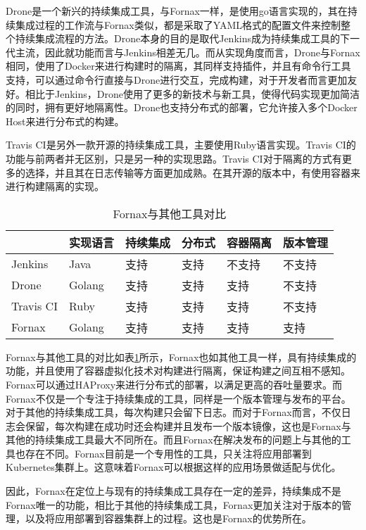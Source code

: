 Drone是一个新兴的持续集成工具，与Fornax一样，是使用go语言实现的，其在持续集成过程的工作流与Fornax类似，都是采取了YAML格式的配置文件来控制整个持续集成流程的方法。Drone本身的目的是取代Jenkins成为持续集成工具的下一代主流，因此就功能而言与Jenkins相差无几。而从实现角度而言，Drone与Fornax相同，使用了Docker来进行构建时的隔离，其同样支持插件，并且有命令行工具支持，可以通过命令行直接与Drone进行交互，完成构建，对于开发者而言更加友好。相比于Jenkins，Drone使用了更多的新技术与新工具，使得代码实现更加简洁的同时，拥有更好地隔离性。Drone也支持分布式的部署，它允许接入多个Docker Host来进行分布式的构建。

Travis CI是另外一款开源的持续集成工具，主要使用Ruby语言实现。Travis CI的功能与前两者并无区别，只是另一种的实现思路。Travis CI对于隔离的方式有更多的选择，并且其在日志传输等方面更加成熟。在其开源的版本中，有使用容器来进行构建隔离的实现。

\begin{table}[!hpb]
  \centering
  \caption{Fornax与其他工具对比}
  \label{tab:advantage}
  \begin{tabular}{llllll} \toprule
     & 实现语言 & 持续集成 & 分布式 & 容器隔离 & 版本管理 \\ \midrule
    Jenkins & Java & 支持 & 支持 & 不支持 & 不支持 \\
    Drone & Golang & 支持 & 支持 & 支持 & 不支持 \\
    Travis CI & Ruby & 支持 & 支持 & 支持 & 不支持 \\
    Fornax & Golang & 支持 & 支持 & 支持 & 支持 \\ \bottomrule
  \end{tabular}
\end{table}

Fornax与其他工具的对比如表\ref{tab:advantage}所示，Fornax也如其他工具一样，具有持续集成的功能，并且使用了容器虚拟化技术对构建进行隔离，保证构建之间互相不感知。Fornax可以通过HAProxy来进行分布式的部署，以满足更高的吞吐量要求。而Fornax不仅是一个专注于持续集成的工具，同样是一个版本管理与发布的平台。对于其他的持续集成工具，每次构建只会留下日志。而对于Fornax而言，不仅日志会保留，每次构建在成功时还会构建并且发布一个版本镜像，这也是Fornax与其他的持续集成工具最大不同所在。而且Fornax在解决发布的问题上与其他的工具也存在不同。Fornax目前是一个专用性的工具，只关注将应用部署到Kubernetes集群上。这意味着Fornax可以根据这样的应用场景做适配与优化。

因此，Fornax在定位上与现有的持续集成工具存在一定的差异，持续集成不是Fornax唯一的功能，相比于其他的持续集成工具，Fornax更加关注对于版本的管理，以及将应用部署到容器集群上的过程。这也是Fornax的优势所在。